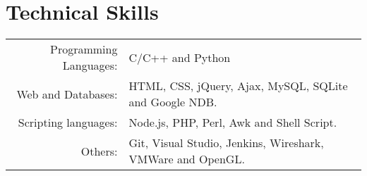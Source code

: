\section{Technical Skills}
\renewcommand{\arraystretch}{1}%
\begin{tabular}{rl}

Programming Languages: &  C/C++ and Python \\
Web and Databases: & HTML, CSS, jQuery, Ajax, MySQL, SQLite and Google NDB.\\
Scripting languages: & Node.js, PHP, Perl, Awk and Shell Script.\\
Others: & Git, Visual Studio, Jenkins, Wireshark, VMWare and OpenGL. \\
\end{tabular}
\vspace{5pt}
